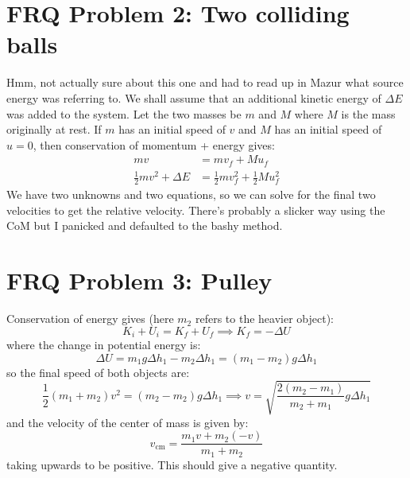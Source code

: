 \documentclass{article}
\begin{document}
\section*{FRQ Problem 2: Two colliding balls}
Hmm, not actually sure about this one and had to read up in Mazur what source energy was referring to. We shall assume that an additional kinetic energy of $\Delta E$ was added to the system. Let the two masses be $m$ and $M$ where $M$ is the mass originally at rest. If $m$ has an initial speed of $v$ and $M$ has an initial speed of $u=0$, then conservation of momentum + energy gives:
\begin{align*}
    mv &= mv_f+Mu_f \\
    \frac{1}{2}mv^2+\Delta E &= \frac{1}{2}mv_f^2+\frac{1}{2}Mu_f^2
\end{align*}
We have two unknowns and two equations, so we can solve for the final two velocities to get the relative velocity. There's probably a slicker way using the CoM but I panicked and defaulted to the bashy method.

\section*{FRQ Problem 3: Pulley}
Conservation of energy gives (here $m_2$ refers to the heavier object):
\begin{equation}
    K_i+U_i = K_f + U_f \implies K_f = -\Delta U 
    \label{eq:}
\end{equation}
where the change in potential energy is:
\begin{equation}
    \Delta U = m_1g \Delta h_1-m_2\Delta h_1 = (m_1-m_2)g\Delta h_1
    \label{eq:}
\end{equation}
so the final speed of both objects are:
\begin{equation}
    \frac{1}{2}(m_1+m_2)v^2 = (m_2-m_2)g\Delta h_1 \implies v = \sqrt{\frac{2(m_2-m_1)}{m_2+m_1}g\Delta h_1}
    \label{eq:}
\end{equation}
and the velocity of the center of mass is given by:
\begin{equation}
    v_\text{cm} = \frac{m_1v+m_2(-v)}{m_1+m_2} 
    \label{eq:}
\end{equation}
taking upwards to be positive. This should give a negative quantity.
\end{document}
